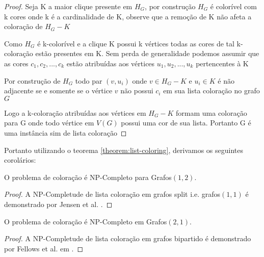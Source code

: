 \begin{proof}
	Seja K a maior clique presente em $H_G$, por construção $H_G$ é colorível com k cores onde k é a cardinalidade de K, observe que a remoção de K não afeta a coloração de $H_G - K$
	
	Como $H_G$ é k-colorível e a clique K possui k vértices todas as cores de tal k-coloração estão presentes em K. Sem perda de generalidade podemos assumir que as cores $c_1,c_2,...,c_k$ estão atribuídas aos vértices $u_1,u_2,...,u_k$ pertencentes à K
	
	Por construção de $H_G$ todo par $(v,u_i)$ onde $v \in H_G - K$ e $u_i \in K$ é não adjacente se e somente se o vértice $v$ não possui $c_i$ em sua lista coloração no grafo $G$
	
	Logo a k-coloração atribuídas aos vértices em $H_G - K$ formam uma coloração para G onde todo vértice em $V(G)$ possui uma cor de sua lista. Portanto G é uma instância sim de lista coloração
\end{proof}
Portanto utilizando o teorema \ref{theorem:list-coloring}, derivamos os seguintes corolários:
\begin{corolario}
	O problema de coloração é NP-Completo para Grafos$(1,2)$.
	\begin{proof}
		A NP-Completude de lista coloração em grafos split i.e. grafos$(1,1)$ é demonstrado por Jensen et al. \cite{jansen1997}.
	\end{proof}
\end{corolario}
\begin{corolario}
	O problema de coloração é NP-Completo em Grafos$(2,1)$.
	\begin{proof}
		A NP-Completude de lista coloração em grafos bipartido é demonstrado por Fellows et al. em \cite{fellows07}.
	\end{proof}
\end{corolario}    
